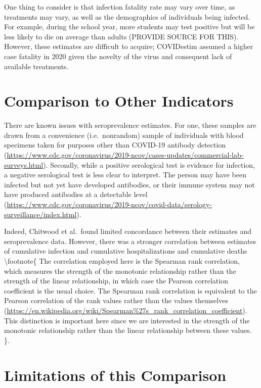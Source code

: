 \documentclass[12pt,twoside]{smiththesis}
\begin{document}
One thing to consider is that infection fatality rate may vary over time, as treatments may vary, as well as the demographics of individuals being infected. For example, during the school year, more students may test positive but will be less likely to die on average than adults (PROVIDE SOURCE FOR THIS). However, these estimates are difficult to acquire; COVIDestim assumed a higher case fatality in 2020 given the novelty of the virus and consequent lack of available treatments.

\hypertarget{comparison-to-other-indicators}{%
\section{Comparison to Other Indicators}\label{comparison-to-other-indicators}}

There are known issues with seroprevalence estimates. For one, these samples are drawn from a convenience (i.e.~nonrandom) sample of individuals with blood specimens taken for purposes other than COVID-19 antibody detection (\url{https://www.cdc.gov/coronavirus/2019-ncov/cases-updates/commercial-lab-surveys.html}). Secondly, while a positive serological test is evidence for infection, a negative serological test is less clear to interpret. The person may have been infected but not yet have developed antibodies, or their immune system may not have produced antibodies at a detectable level (\url{https://www.cdc.gov/coronavirus/2019-ncov/covid-data/serology-surveillance/index.html}).

Indeed, Chitwood et al.~found limited concordance between their estimates and seroprevalence data. However, there was a stronger correlation between estimates of cumulative infection and cumulative hospitalizations and cumulative deaths \textbackslash footnote\{ The correlation employed here is the Spearman rank correlation, which measures the strength of the monotonic relationship rather than the strength of the linear relationship, in which case the Pearson correlation coefficient is the usual choice. The Spearman rank correlation is equivalent to the Pearson correlation of the rank values rather than the values themselves (\url{https://en.wikipedia.org/wiki/Spearman\%27s_rank_correlation_coefficient}). This distinction is important here since we are interested in the strength of the monotonic relationship rather than the linear relationship between these values. \}.

\newpage

\hypertarget{limitations-of-this-comparison}{%
\section{Limitations of this Comparison}\label{limitations-of-this-comparison}}
\end{document}
